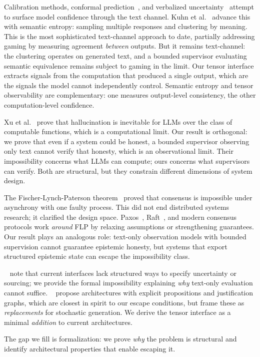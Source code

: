  Calibration methods, conformal
prediction~\cite{angelopoulos2021gentle}, and verbalized
uncertainty~\cite{kadavath2022language} attempt to surface model confidence
through the text channel. Kuhn et
al.~\cite{kuhn2023semanticuncertaintylinguisticinvariances} advance this with
semantic entropy: sampling multiple responses and clustering by meaning. This
is the most sophisticated text-channel approach to date, partially addressing
gaming by measuring agreement \emph{between} outputs. But it remains
text-channel: the clustering operates on generated text, and a bounded
supervisor evaluating semantic equivalence remains subject to gaming in the
limit. Our tensor interface extracts signals from the computation that produced
a single output, which are the signals the model cannot independently control. Semantic
entropy and tensor observability are complementary: one measures output-level
consistency, the other computation-level confidence.

 Xu et
al.~\cite{xu2024hallucination} prove that hallucination is inevitable for LLMs
over the class of computable functions, which is a computational limit. Our result is
orthogonal: we prove that even if a system could be honest, a bounded
supervisor observing only text cannot verify that honesty, which is an observational
limit. Their impossibility concerns what LLMs can compute; ours concerns what
supervisors can verify. Both are structural, but they constrain different
dimensions of system design.

 The
Fischer-Lynch-Paterson theorem~\cite{flp} proved that consensus is impossible
under asynchrony with one faulty process. This did not end distributed systems
research; it clarified the design space. Paxos~\cite{paxos}, Raft~\cite{raft}, and modern
consensus protocols work \emph{around} FLP by relaxing assumptions or
strengthening guarantees. Our result plays an analogous role: text-only
observation models with bounded supervision cannot guarantee epistemic honesty,
but systems that export structured epistemic state can escape the impossibility
class.

 \citeauthor{clark2025epistemicalignmentmediatingframework}
~\cite{clark2025epistemicalignmentmediatingframework} note that current interfaces lack structured ways
to specify uncertainty or sourcing; we provide the formal impossibility
explaining \emph{why} text-only evaluation cannot suffice. \citeauthor{wright2025predictionstructuringepistemic}~\cite{wright2025predictionstructuringepistemic} propose architectures with explicit propositions
and justification graphs, which are closest in spirit to our escape conditions, but
frame these as \emph{replacements} for stochastic generation. We derive the
tensor interface as a minimal \emph{addition} to current architectures.

The gap we fill is formalization: we prove \emph{why} the problem is structural
and identify architectural properties that enable escaping it.
